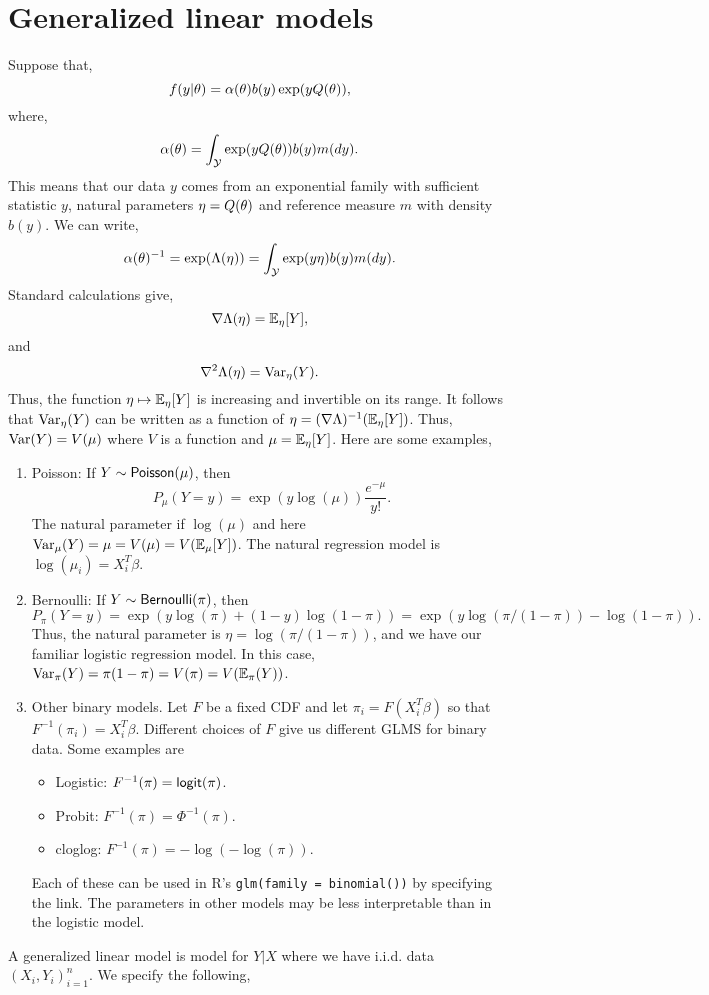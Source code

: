 \section{Generalized linear models}
Suppose that,
\[f(y|{\theta}) = \alpha({\theta})b(y)\exp(yQ({\theta})), \]
where,
\[\alpha({\theta}) = \int_{\mathcal{Y}} \exp(yQ({\theta}))b(y)m(dy). \]
This means that our data $y$ comes from an exponential family with sufficient statistic $y$, natural parameters $\eta = Q({\theta})$ and reference measure $m$ with density $b(y)$. We can write,
\[{\alpha}({\theta})^{-1} = \exp(\Lambda(\eta)) =\int_{\mathcal{Y}} \exp(y\eta)b(y)m(dy). \]
Standard calculations give,
\[\nabla \Lambda(\eta) = {\mathbb{E}}_\eta[Y], \]
and 
\[\nabla^2 \Lambda(\eta) = \operatorname{Var}_\eta(Y). \] 
Thus, the function $\eta \mapsto {\mathbb{E}}_\eta[Y]$ is increasing and invertible on its range. It follows that $\operatorname{Var}_\eta(Y)$ can be written as a function of $\eta = (\nabla \Lambda)^{-1}({\mathbb{E}}_\eta[Y])$. Thus, $\operatorname{Var}(Y) = V(\mu)$ where $V$ is a function and $\mu = {\mathbb{E}}_\eta[Y]$. Here are some examples,
\begin{enumerate}
    \item Poisson: If $Y \sim \mathsf{Poisson}(\mu)$, then \[P_\mu(Y=y)=\exp(y\log(\mu))\frac{e^{-\mu}}{y!}.\]
    The natural parameter if $\log(\mu)$ and here $\operatorname{Var}_\mu(Y)=\mu=V(\mu)=V({\mathbb{E}}_\mu[Y])$. The natural regression model is $\log(\mu_i)=X_i^T\beta$.
    \item Bernoulli: If $Y\sim \mathsf{Bernoulli}(\pi)$, then \[P_{\pi}(Y=y) = \exp(y\log(\pi)+(1-y)\log(1-\pi))=\exp(y\log(\pi/(1-\pi))-\log(1-\pi)).\]
    Thus, the natural parameter is $\eta = \log(\pi/(1-\pi))$, and we have our familiar logistic regression model. In this case, $\operatorname{Var}_\pi(Y)=\pi(1-\pi)=V(\pi)=V({\mathbb{E}}_\pi(Y))$.
    \item Other binary models. Let $F$ be a fixed CDF and let $\pi_i = F(X_i^T\beta)$ so that $F^{-1}(\pi_i)=X_i^T\beta$. Different choices of $F$ give  us different GLMS for binary data. Some examples are
    \begin{itemize}
        \item Logistic: $F^{-1}(\pi)=\mathsf{logit}(\pi)$.
        \item Probit: $F^{-1}(\pi)=\Phi^{-1}(\pi)$.
        \item cloglog: $F^{-1}(\pi)=-\log(-\log(\pi))$.
    \end{itemize}
    Each of these  can be used in R's \texttt{glm(family = binomial())} by specifying the link. The parameters in other models may be less interpretable than in the logistic model.
\end{enumerate}
A generalized linear model is model  for $Y|X$ where we have i.i.d.  data $(X_i,Y_i)_{i=1}^n$.  We specify  the  following,
